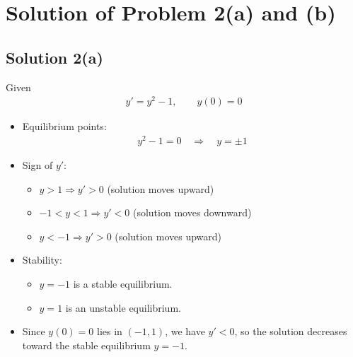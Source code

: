 \documentclass[letterpaper,10pt,english]{sphinxmanual}
\begin{document}
\section{Solution of Problem 2(a) and (b)}
\label{\detokenize{Language/Science_language/ODE_calculus/course_MATH_3035/homework_assignments/index_pdf:solution-of-problem-2-a-and-b}}

\subsection{Solution 2(a)}
\label{\detokenize{Language/Science_language/ODE_calculus/course_MATH_3035/homework_assignments/index_pdf:solution-2-a}}
\sphinxAtStartPar
Given
\begin{equation*}
\begin{split}y' = y^2 - 1, \qquad y(0)=0\end{split}
\end{equation*}\begin{itemize}
\item {} 
\sphinxAtStartPar
Equilibrium points:
\begin{equation*}
\begin{split}y^2 - 1 = 0 \quad \Rightarrow \quad y=\pm 1\end{split}
\end{equation*}
\item {} 
\sphinxAtStartPar
Sign of \(y'\):
\begin{itemize}
\item {} 
\sphinxAtStartPar
\(y>1 \Rightarrow y'>0\) (solution moves upward)

\item {} 
\sphinxAtStartPar
\(-1<y<1 \Rightarrow y'<0\) (solution moves downward)

\item {} 
\sphinxAtStartPar
\(y<-1 \Rightarrow y'>0\) (solution moves upward)

\end{itemize}

\item {} 
\sphinxAtStartPar
Stability:
\begin{itemize}
\item {} 
\sphinxAtStartPar
\(y=-1\) is a stable equilibrium.

\item {} 
\sphinxAtStartPar
\(y=1\) is an unstable equilibrium.

\end{itemize}

\item {} 
\sphinxAtStartPar
Since \(y(0)=0\) lies in \((-1,1)\), we have \(y'<0\), so the solution decreases toward the stable equilibrium \(y=-1\).

\end{itemize}
\end{document}
